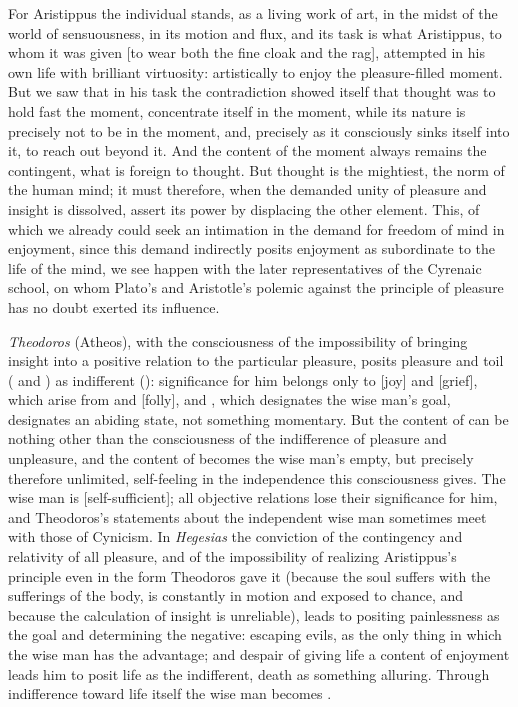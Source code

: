 For Aristippus the individual stands, as a living work of art, in the midst of the world of sensuousness, in its motion and
flux, and its task is what Aristippus, to whom it was
given  [to wear both the fine cloak and the rag], attempted in his own life with brilliant
virtuosity: artistically to enjoy the pleasure-filled moment.
But we saw that in his task the contradiction showed itself
that thought was to hold fast the moment, concentrate itself in the moment, while its nature is precisely not to be in the moment,
and, precisely as it consciously sinks itself into it, to reach out beyond it. And the content of the moment always remains the contingent,
what is foreign to thought. But thought is the mightiest,
the norm of the human mind; it must therefore, when the demanded
unity of pleasure and insight is dissolved, assert its power
by displacing the other element. This, of which we already
could seek an intimation in the demand for freedom of mind in enjoyment, since this demand indirectly posits enjoyment as
subordinate to the life of the mind, we see happen with the later representatives of the Cyrenaic school, on whom Plato's and
Aristotle's polemic against the principle of pleasure has no doubt exerted its influence.

\emph{Theodoros} (Atheos), with the consciousness of the impossibility of bringing insight into a positive relation to the
particular pleasure, posits pleasure and toil ( and ) as indifferent
(): significance for him belongs only to  [joy] and  [grief], which
arise from  and  [folly], and , which designates the
wise man's goal, designates an abiding state, not something momentary. But the content of  can be nothing other than
the consciousness of the indifference of pleasure and unpleasure, and the content of  becomes the wise man's empty, but precisely therefore
unlimited, self-feeling in the independence this consciousness gives. The wise man is  [self-sufficient]; all objective relations lose
their significance for him, and Theodoros's statements about the independent wise man sometimes meet with those of Cynicism. In \emph{Hegesias} the conviction of the contingency and relativity of all pleasure, and of the impossibility of realizing Aristippus's principle
even in the form Theodoros gave it (because the soul suffers with
the sufferings of the body, is constantly in motion and exposed to chance, and because the calculation of insight is unreliable), leads to
positing painlessness as the goal and determining the negative:
escaping evils, as the only thing in which the wise man has the
advantage; and despair of giving life a content of enjoyment
leads him to posit life as the indifferent, death as
something alluring. Through indifference toward life itself
the wise man becomes .

